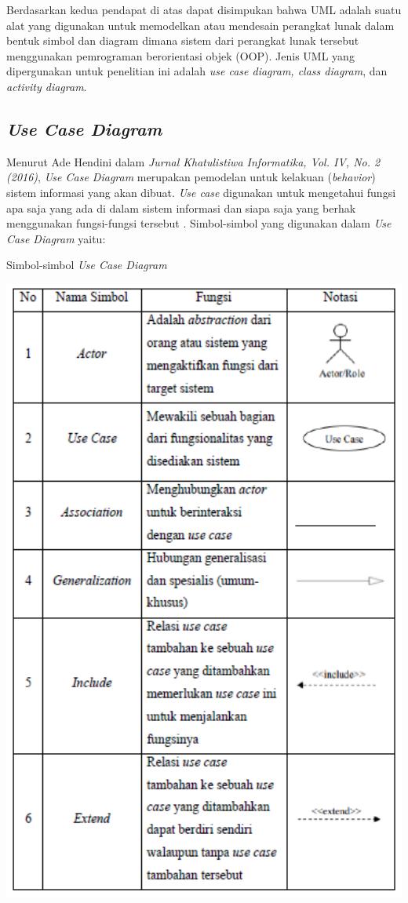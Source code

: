 Berdasarkan kedua pendapat di atas dapat disimpukan bahwa UML adalah suatu alat yang digunakan untuk memodelkan atau mendesain perangkat lunak dalam bentuk simbol dan diagram dimana sistem dari perangkat lunak tersebut menggunakan pemrograman berorientasi objek (OOP). Jenis UML yang dipergunakan untuk penelitian ini adalah \textit{use case diagram, class diagram}, dan \textit{activity diagram}. 

\subsection{\emph{Use Case Diagram}} 

Menurut Ade Hendini dalam \textit{Jurnal Khatulistiwa Informatika, Vol. IV, No. 2 (2016)}, \textit{Use Case Diagram }merupakan pemodelan untuk kelakuan (\textit{behavior}) sistem informasi yang akan dibuat. \textit{Use case} digunakan untuk mengetahui fungsi apa saja yang ada di dalam sistem informasi dan siapa saja yang berhak menggunakan fungsi-fungsi tersebut \cite{AdeHendini}. Simbol-simbol yang digunakan dalam \textit{Use Case Diagram} yaitu:

\begin{table}[H]
	\centering
	\caption{Simbol-simbol \emph{Use Case Diagram} \cite{AdeHendini}}
	\includegraphics[width=1.0\textwidth]{gambar/simbolusecase}
	\label{tabel_karaktermax2}
\end{table}

